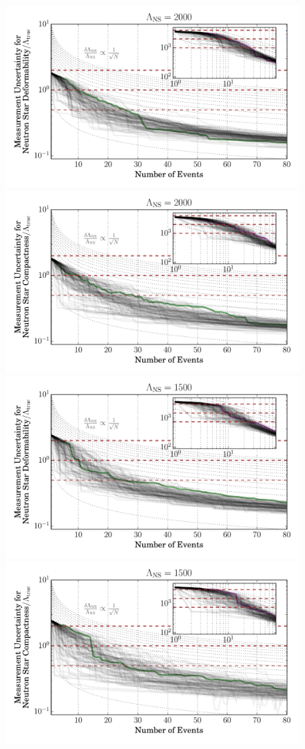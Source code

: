 \documentclass[aps,prd,amsmath,floats,floatfix, twocolumn,
superscriptaddress,nofootinbib,showpacs]{revtex4-1}
\begin{document}
\begin{figure}
\centering    
\includegraphics[width=0.85\columnwidth]{plots/LambdaCIWidths_vs_N_AllPopulations_Log_L2000.pdf}
\includegraphics[width=0.85\columnwidth]{plots/LambdaCIWidths_vs_N_AstroPopulations_Log_L2000.pdf}\\
\includegraphics[width=0.85\columnwidth]{plots/LambdaCIWidths_vs_N_AllPopulations_Log_L1500.pdf}
\includegraphics[width=0.85\columnwidth]{plots/LambdaCIWidths_vs_N_AstroPopulations_Log_L1500.pdf}\\

\end{figure}
\end{document}
